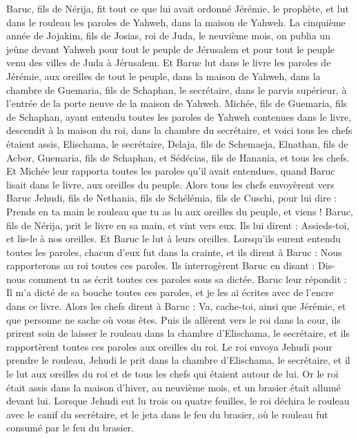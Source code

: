 \begin{multicols}{2}
Baruc, fils de Nérija, fit tout ce que lui avait ordonné Jérémie, le prophète, et lut dans le rouleau les paroles de Yahweh, dans la maison de Yahweh.
La cinquième année de Jojakim, fils de Josias, roi de Juda, le neuvième mois, on publia un jeûne devant Yahweh pour tout le peuple de Jérusalem et pour tout le peuple venu des villes de Juda à Jérusalem.
Et Baruc lut dans le livre les paroles de Jérémie, aux oreilles de tout le peuple, dans la maison de Yahweh, dans la chambre de Guemaria, fils de Schaphan, le secrétaire, dans le parvis supérieur, à l'entrée de la porte neuve de la maison de Yahweh.
Michée, fils de Guemaria, fils de Schaphan, ayant entendu toutes les paroles de Yahweh contenues dans le livre,
descendit à la maison du roi, dans la chambre du secrétaire, et voici tous les chefs étaient assis, Elischama, le secrétaire, Delaja, fils de Schemaeja, Elnathan, fils de Acbor, Guemaria, fils de Schaphan, et Sédécias, fils de Hanania, et tous les chefs.
Et Michée leur rapporta toutes les paroles qu'il avait entendues, quand Baruc lisait dans le livre, aux oreilles du peuple.
Alors tous les chefs envoyèrent vers Baruc Jehudi, fils de Nethania, fils de Schélémia, fils de Cuschi, pour lui dire : Prends en ta main le rouleau que tu as lu aux oreilles du peuple, et viens ! Baruc, fils de Nérija, prit le livre en sa main, et vint vers eux.
Ils lui dirent : Assieds-toi, et lis-le à nos oreilles. Et Baruc le lut à leurs oreilles.
Lorsqu’ils eurent entendu toutes les paroles, chacun d’eux fut dans la crainte, et ils dirent à Baruc : Nous rapporterons au roi toutes ces paroles.
Ils interrogèrent Baruc en disant : Dis-nous comment tu as écrit toutes ces paroles sous sa dictée.
Baruc leur répondit : Il m’a dicté de sa bouche toutes ces paroles, et je les ai écrites avec de l'encre dans ce livre.
Alors les chefs dirent à Baruc : Va, cache-toi, ainsi que Jérémie, et que personne ne sache où vous êtes.
Puis ils allèrent vers le roi dans la cour, ils prirent soin de laisser le rouleau dans la chambre d'Elischama, le secrétaire, et ils rapportèrent toutes ces paroles aux oreilles du roi.
Le roi envoya Jehudi pour prendre le rouleau, Jehudi le prit dans la chambre d'Elischama, le secrétaire, et il le lut aux oreilles du roi et de tous les chefs qui étaient autour de lui.
Or le roi était assis dans la maison d'hiver, au neuvième mois, et un brasier était allumé devant lui.
Lorsque Jehudi eut lu trois ou quatre feuilles, le roi déchira le rouleau avec le canif du secrétaire, et le jeta dans le feu du brasier, où le rouleau fut consumé par le feu du brasier.

\end{multicols}
